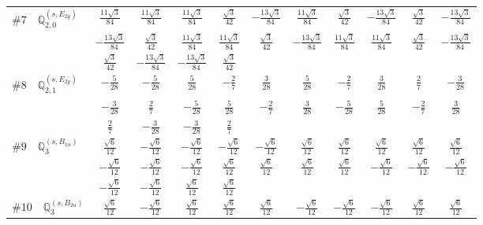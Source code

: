 \documentclass[fleqn,9pt,landscape]{jsarticle}
\begin{document}
\begin{center}
\begin{longtable}{lcccccccccc}
$ \#7\quad \mathbb{Q}_{2,0}^{(s,E_{2g})} $ & $ \frac{11 \sqrt{3}}{84} $ & $ \frac{11 \sqrt{3}}{84} $ & $ \frac{11 \sqrt{3}}{84} $ & $ \frac{\sqrt{3}}{42} $ & $ - \frac{13 \sqrt{3}}{84} $ & $ \frac{11 \sqrt{3}}{84} $ & $ \frac{\sqrt{3}}{42} $ & $ - \frac{13 \sqrt{3}}{84} $ & $ \frac{\sqrt{3}}{42} $ & $ - \frac{13 \sqrt{3}}{84} $ \\
& $ - \frac{13 \sqrt{3}}{84} $ & $ \frac{\sqrt{3}}{42} $ & $ \frac{11 \sqrt{3}}{84} $ & $ \frac{11 \sqrt{3}}{84} $ & $ \frac{\sqrt{3}}{42} $ & $ - \frac{13 \sqrt{3}}{84} $ & $ \frac{11 \sqrt{3}}{84} $ & $ \frac{11 \sqrt{3}}{84} $ & $ \frac{\sqrt{3}}{42} $ & $ - \frac{13 \sqrt{3}}{84} $ \\
& $ \frac{\sqrt{3}}{42} $ & $ - \frac{13 \sqrt{3}}{84} $ & $ - \frac{13 \sqrt{3}}{84} $ & $ \frac{\sqrt{3}}{42} $ & $  $ & $  $ & $  $ & $  $ & $  $ & $  $ \\ \hline
$ \#8\quad \mathbb{Q}_{2,1}^{(s,E_{2g})} $ & $ - \frac{5}{28} $ & $ - \frac{5}{28} $ & $ \frac{5}{28} $ & $ - \frac{2}{7} $ & $ \frac{3}{28} $ & $ \frac{5}{28} $ & $ - \frac{2}{7} $ & $ \frac{3}{28} $ & $ \frac{2}{7} $ & $ - \frac{3}{28} $ \\
& $ - \frac{3}{28} $ & $ \frac{2}{7} $ & $ - \frac{5}{28} $ & $ \frac{5}{28} $ & $ - \frac{2}{7} $ & $ \frac{3}{28} $ & $ - \frac{5}{28} $ & $ \frac{5}{28} $ & $ - \frac{2}{7} $ & $ \frac{3}{28} $ \\
& $ \frac{2}{7} $ & $ - \frac{3}{28} $ & $ - \frac{3}{28} $ & $ \frac{2}{7} $ & $  $ & $  $ & $  $ & $  $ & $  $ & $  $ \\ \hline
$ \#9\quad \mathbb{Q}_{3}^{(s,B_{1u})} $ & $ \frac{\sqrt{6}}{12} $ & $ - \frac{\sqrt{6}}{12} $ & $ - \frac{\sqrt{6}}{12} $ & $ - \frac{\sqrt{6}}{12} $ & $ - \frac{\sqrt{6}}{12} $ & $ \frac{\sqrt{6}}{12} $ & $ \frac{\sqrt{6}}{12} $ & $ \frac{\sqrt{6}}{12} $ & $ \frac{\sqrt{6}}{12} $ & $ \frac{\sqrt{6}}{12} $ \\
& $ - \frac{\sqrt{6}}{12} $ & $ - \frac{\sqrt{6}}{12} $ & $ - \frac{\sqrt{6}}{12} $ & $ \frac{\sqrt{6}}{12} $ & $ \frac{\sqrt{6}}{12} $ & $ \frac{\sqrt{6}}{12} $ & $ \frac{\sqrt{6}}{12} $ & $ - \frac{\sqrt{6}}{12} $ & $ - \frac{\sqrt{6}}{12} $ & $ - \frac{\sqrt{6}}{12} $ \\
& $ - \frac{\sqrt{6}}{12} $ & $ - \frac{\sqrt{6}}{12} $ & $ \frac{\sqrt{6}}{12} $ & $ \frac{\sqrt{6}}{12} $ & $  $ & $  $ & $  $ & $  $ & $  $ & $  $ \\ \hline
$ \#10\quad \mathbb{Q}_{3}^{(s,B_{2u})} $ & $ \frac{\sqrt{6}}{12} $ & $ - \frac{\sqrt{6}}{12} $ & $ \frac{\sqrt{6}}{12} $ & $ \frac{\sqrt{6}}{12} $ & $ \frac{\sqrt{6}}{12} $ & $ - \frac{\sqrt{6}}{12} $ & $ - \frac{\sqrt{6}}{12} $ & $ - \frac{\sqrt{6}}{12} $ & $ \frac{\sqrt{6}}{12} $ & $ \frac{\sqrt{6}}{12} $ \\

\end{longtable}
\end{center}
\end{document}
